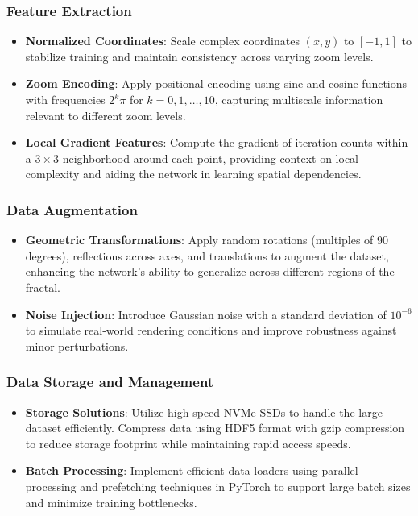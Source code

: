 \documentclass[journal]{IEEEaccess}
\begin{document}
\subsubsection{Feature Extraction}
\begin{itemize}
    \item \textbf{Normalized Coordinates}: Scale complex coordinates \( (x, y) \) to \([-1, 1]\) to stabilize training and maintain consistency across varying zoom levels.
    
    \item \textbf{Zoom Encoding}: Apply positional encoding using sine and cosine functions with frequencies \(2^k \pi\) for \(k = 0, 1, \ldots, 10\), capturing multiscale information relevant to different zoom levels.
    
    \item \textbf{Local Gradient Features}: Compute the gradient of iteration counts within a \(3 \times 3\) neighborhood around each point, providing context on local complexity and aiding the network in learning spatial dependencies.
\end{itemize}

\subsubsection{Data Augmentation}
\begin{itemize}
    \item \textbf{Geometric Transformations}: Apply random rotations (multiples of 90 degrees), reflections across axes, and translations to augment the dataset, enhancing the network's ability to generalize across different regions of the fractal.
    
    \item \textbf{Noise Injection}: Introduce Gaussian noise with a standard deviation of \(10^{-6}\) to simulate real-world rendering conditions and improve robustness against minor perturbations.
\end{itemize}

\subsubsection{Data Storage and Management}
\begin{itemize}
    \item \textbf{Storage Solutions}: Utilize high-speed NVMe SSDs to handle the large dataset efficiently. Compress data using HDF5 format with gzip compression to reduce storage footprint while maintaining rapid access speeds.
    
    \item \textbf{Batch Processing}: Implement efficient data loaders using parallel processing and prefetching techniques in PyTorch to support large batch sizes and minimize training bottlenecks.
\end{itemize}
\end{document}
